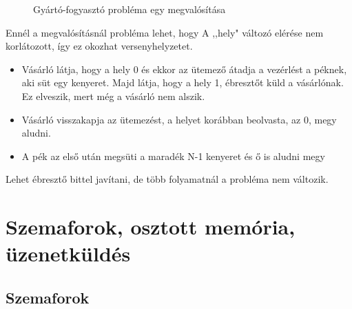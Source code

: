 \documentclass[margin=0px]{article}
\begin{document}
\begin{itemize}
\begin{figure}[H]
              \caption{Gyártó-fogyasztó probléma egy megvalósítása}
          \end{figure}
          Ennél a megvalósításnál probléma lehet, hogy A ,,hely" változó elérése nem korlátozott, így ez okozhat versenyhelyzetet.
          \begin{itemize}
              \item Vásárló látja, hogy a hely 0 és ekkor az ütemező átadja a vezérlést a péknek, aki süt egy kenyeret. Majd látja, hogy a hely 1, ébresztőt küld a vásárlónak. Ez elveszik, mert még a vásárló nem alszik.
              \item Vásárló visszakapja az ütemezést, a helyet korábban beolvasta, az 0, megy aludni.
              \item A pék az első után megsüti a maradék N-1 kenyeret és ő is aludni megy
          \end{itemize}
          Lehet ébresztő bittel javítani, de több folyamatnál a probléma nem változik.
\end{itemize}

\section{Szemaforok, osztott memória, üzenetküldés}

\subsection{Szemaforok}
\end{document}
